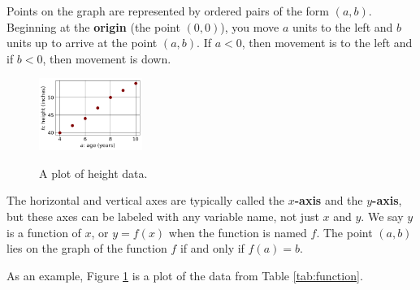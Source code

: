 Points on the graph are represented by ordered pairs of the form $(a, b)$. Beginning at the {\bf origin} (the point $(0,0)$), you move $a$ units to the left and $b$ units up to arrive at the point $(a, b)$. If $a<0$, then movement is to the left and if $b<0$, then movement is down.

\begin{figure}
    \centering
    \vspace{-12pt}
    \includegraphics[width=0.3\textwidth]{img/chap1/sec1-2/table1-1.png}\\
    \caption{A plot of height data.}
    \label{fig:heightplot}
\end{figure}
The horizontal and vertical axes are typically called the {\bf $x$-axis} and the {\bf $y$-axis}, but these axes can be labeled with any variable name, not just $x$ and $y$. We say $y$ is a function of $x$, or $y = f(x)$ when the function is named $f$. The point $(a, b)$ lies on the graph of the function $f$ if and only if $f(a)=b$.

As an example, Figure \ref{fig:heightplot} is a plot of the data from Table \ref{tab:function}.

